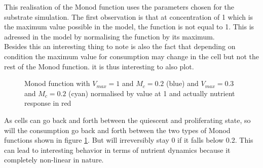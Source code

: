 \documentclass[11pt,a4paper]{article}
\begin{document}
This realisation of the Monod function uses the parameters chosen for the substrate simulation. The first observation is that at concentration of 1 which is the maximum value possible in the model, the function is not equal to 1. This is adressed in the model by normalising the function by its maximum.\\

Besides this an interesting thing to note is also the fact that depending on condition the maximum value for consumption may change in the cell but not the rest of the Monod function. it is thus interesting to also plot.\\

\begin{figure}[ht!]
\begin{center}
\end{center}
\caption{Monod function with $V_{max} =1 $ and $M_c = 0.2$ (blue) and  $V_{max} =0.3 $ and $M_c = 0.2$ (cyan) normalised by value at 1 and actually nutrient response in red \label{monod2}}
\end{figure}

As cells can go back and forth between the quiescent and proliferating state, so will the consumption go back and forth between the two types of Monod functions shown in figure \ref{monod2}. But will irreversibly stay 0 if it falls below 0.2. This can lead to interesting behavior in terms of nutrient dynamics because it completely non-linear in nature.\\
\end{document}
